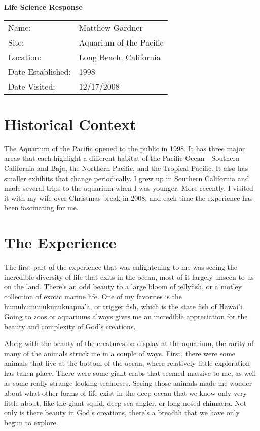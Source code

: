 \documentclass[onecolumn, 12pt]{article}
\title{}
\author{Matthew Gardner}
\date{}
\begin{document}
\textbf{Life Science Response}

\begin{tabular}{ll}
  Name:&Matthew Gardner \\
  Site:&Aquarium of the Pacific \\
  Location:&Long Beach, California \\
  Date Established:&1998 \\
  Date Visited:&12/17/2008 \\
\end{tabular}

\section*{Historical Context}

The Aquarium of the Pacific opened to the public in 1998.  It has three major
areas that each highlight a different habitat of the Pacific Ocean---Southern
California and Baja, the Northern Pacific, and the Tropical Pacific.  It also
has smaller exhibits that change periodically.  I grew up in Southern
California and made several trips to the aquarium when I was younger.  More
recently, I visited it with my wife over Christmas break in 2008, and each time
the experience has been fascinating for me.

\section*{The Experience}

The first part of the experience that was enlightening to me was seeing the
incredible diversity of life that exits in the ocean, most of it largely unseen
to us on the land.  There's an odd beauty to a large bloom of jellyfish, or a
motley collection of exotic marine life.  One of my favorites is the
humuhumunukunukuapua'a, or trigger fish, which is the state fish of Hawai'i.
Going to zoos or aquariums always gives me an incredible appreciation for the
beauty and complexity of God's creations.

Along with the beauty of the creatures on display at the aquarium, the rarity
of many of the animals struck me in a couple of ways.  First, there were some
animals that live at the bottom of the ocean, where relatively little
exploration has taken place.  There were some giant crabs that seemed massive
to me, as well as some really strange looking seahorses.  Seeing those animals
made me wonder about what other forms of life exist in the deep ocean that we
know only very little about, like the giant squid, deep sea angler, or
long-nosed chimaera.  Not only is there beauty in God's creations, there's a
breadth that we have only begun to explore.
\end{document}
